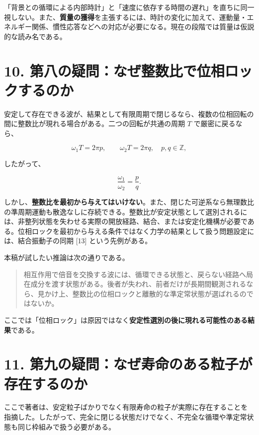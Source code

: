 \documentclass[
  a4paper,
]{ltjsarticle}
\begin{document}
「背景との循環による内部時計」と「速度に依存する時間の遅れ」を直ちに同一視しない。また、\textbf{質量の獲得}を主張するには、時計の変化に加えて、運動量・エネルギー関係、慣性応答などへの対応が必要になる。現在の段階では質量は仮説的な読み名である。

\section{10.
第八の疑問：なぜ整数比で位相ロックするのか}\label{ux7b2cux516bux306eux7591ux554fux306aux305cux6574ux6570ux6bd4ux3067ux4f4dux76f8ux30edux30c3ux30afux3059ux308bux306eux304b}

安定して存在できる波が、結果として有限周期で閉じるなら、複数の位相回転の間に整数比が現れる場合がある。二つの回転が共通の周期
\(T\) で厳密に戻るなら、

\[
\omega_1T=2\pi p,\qquad
\omega_2T=2\pi q,
\quad p,q\in\mathbb Z,
\]

したがって、

\[
\frac{\omega_1}{\omega_2}=\frac pq.
\]

しかし、\textbf{整数比を最初から与えてはいけない}。また、閉じた可逆系なら無理数比の準周期運動も散逸なしに存続できる。整数比が安定状態として選別されるには、非整列状態を失わせる実際の開放経路、結合、または安定化機構が必要である。位相ロックを最初から与える条件ではなく力学の結果として扱う問題設定には、結合振動子の同期
{[}13{]} という先例がある。

本稿が試したい推論は次の通りである。

\begin{quote}
相互作用で倍音を交換する波には、循環できる状態と、戻らない経路へ局在成分を渡す状態がある。後者が失われ、前者だけが長期間観測されるなら、見かけ上、整数比の位相ロックと離散的な準定常状態が選ばれるのではないか。
\end{quote}

ここでは「位相ロック」は原因ではなく\textbf{安定性選別の後に現れる可能性のある結果}である。

\section{11.
第九の疑問：なぜ寿命のある粒子が存在するのか}\label{ux7b2cux4e5dux306eux7591ux554fux306aux305cux5bffux547dux306eux3042ux308bux7c92ux5b50ux304cux5b58ux5728ux3059ux308bux306eux304b}

ここで著者は、安定粒子ばかりでなく有限寿命の粒子が実際に存在することを指摘した。したがって、完全に閉じる状態だけでなく、不完全な循環や準定常状態も同じ枠組みで扱う必要がある。
\end{document}
